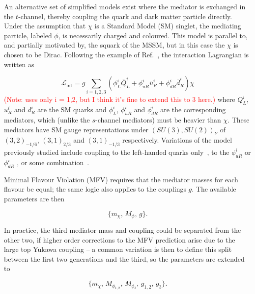 

An alternative set of simplified models exist where the mediator is exchanged in the $t$-channel, thereby coupling the quark and dark matter particle directly. Under the assumption that $\chi$ is a Standard Model (SM) singlet, the mediating particle, labeled $\phi$, is necessarily charged and coloured. This model is parallel to, and partially motivated by, the squark of the MSSM, but in this case the $\chi$ is chosen to be Dirac. Following the example of Ref.~\cite{Papucci:2014}, the interaction Lagrangian is written as

\begin{equation}
\mathcal{L}_{\mathrm{int}} = g \sum_{i=1,2,3} (\phi_L^i \bar{Q}_L^i + \phi_{uR}^i \bar{u}_R^i + \phi_{dR}^i \bar{d}_R^i) \chi
\end{equation}
\textcolor{red}{(Note: \cite{Papucci:2014} uses only i = 1,2, but I think it's fine to extend this to 3 here.)}
where $Q_L^i$, $u_R^i$ and $d_R^i$ are the SM quarks and $\phi_L^i$, $\phi_{uR}^i$ and $\phi_{dR}^i$ are the corresponding mediators, which (unlike the $s$-channel mediators) must be heavier than $\chi$. These mediators have SM gauge representations under $(SU(3), SU(2))_Y$ of $(3,2)_{-1/6}$, $(3,1)_{2/3}$ and $(3,1)_{-1/3}$ respectively. Variations of the model previously studied include coupling to the left-handed quarks only~\cite{Chang:2014, Busoni:2014haa}, to the $\phi_{uR}^i$ \cite{Tait:2013} or $\phi_{dR}^i$ \cite{Papucci:2014, Yavin:14092893}, or some combination~\cite{Bai:201311171, An:201489115014}.

\vspace{5mm}

Minimal Flavour Violation (MFV) requires that the mediator masses for each flavour be equal; the same logic also applies to the couplings $g$. The available parameters are then

\begin{equation}
\{ m_{\chi},\, M_{\phi},\, g\}.
\end{equation}

In practice, the third mediator mass and coupling could be separated from the other two, if higher order corrections to the MFV prediction arise due to the large top Yukawa coupling -- a common variation is then to define this split between the first two generations and the third, so the parameters are extended to

\begin{equation}
\{ m_{\chi},\, M_{\phi_{1,2}},\,M_{\phi_3},\, g_{1,2},\, g_3\}.
\end{equation}

